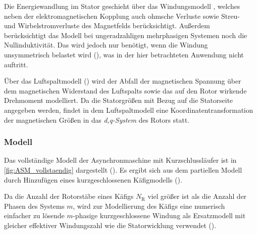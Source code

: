 Die Energiewandlung im Stator geschieht über das Windungsmodell , welches neben der elektro\-mag\-ne\-ti\-schen Kopplung auch ohmsche Verluste sowie Streu- und Wirbelstromverluste des Magnetfelds berücksichtigt. Außerdem berücksichtigt das Modell  bei ungeradzahligen mehrphasigen Systemen noch die Nullinduktivität. Das wird jedoch nur benötigt, wenn die Windung unsymmetrisch belastet wird (\cite[S. 193]{kralModelicaObjektorientierteModellbildung2019}), was in der hier betrachteten Anwendung nicht auftritt.

Über das Luftspaltmodell () wird der Abfall der magnetischen Spannung über dem magnetischen Widerstand des Luftspalts sowie das auf den Rotor wirkende Drehmoment modelliert. Da die Statorgrößen mit Bezug auf die Statorseite angegeben werden, findet in dem Luftspaltmodell eine Koordinatentransformation der magnetischen Größen in das \emph{d,q-System} des Rotors statt.

\hypertarget{sec:modell-ASM}{%
\subsubsection{Modell}\label{sec:modell-ASM}}

Das vollständige Modell der Asynchronmaschine mit Kurzschlussläufer ist in \cref{fig:ASM_vollstaendig} dargestellt (). Es ergibt sich aus dem partiellen Modell durch Hinzufügen eines kurzgeschlossenen Käfigmodells ().

Da die Anzahl der Rotorstäbe eines Käfigs $N_{\mathrm{R}}$  viel größer ist als die Anzahl der Phasen des Systems $m$, wird zur Modellierung des Käfigs eine numerisch einfacher zu lösende $m$-phasige kurzgeschlossene Windung als Ersatzmodell mit gleicher effektiver Windungszahl wie die Statorwicklung verwendet (\cite[S. 194]{kralModelicaObjektorientierteModellbildung2019}).

